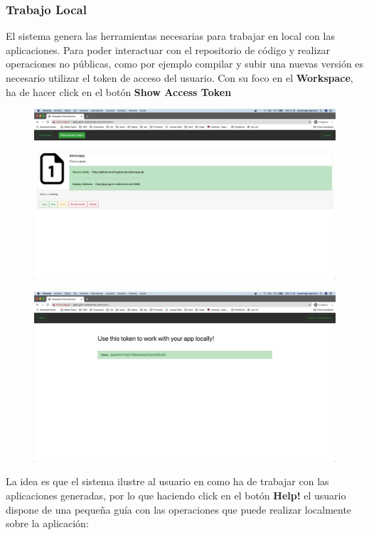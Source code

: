 \documentclass[a4paper,11pt]{book}
\begin{document}
\subsubsection{Trabajo Local}

El sistema genera las herramientas necesarias para trabajar en local con las aplicaciones. Para poder interactuar con el repositorio de código y realizar operaciones no públicas, como por ejemplo compilar y subir una nuevas versión es necesario utilizar el token de acceso del usuario. Con su foco en el \textbf{Workspace}, ha de hacer click en el botón \textbf{Show Access Token}

   \begin{figure}[H]
\centering
\includegraphics[scale=0.2]{imagenes/casouso/3_1.png}
\caption{   }
\end{figure}

   \begin{figure}[H]
\centering
\includegraphics[scale=0.2]{imagenes/casouso/3_3.png}
\caption{   }
\end{figure}

La idea es que el sistema ilustre al usuario en como ha de trabajar con las aplicaciones generadas, por lo  que haciendo click en el botón \textbf{Help!} el usuario dispone de una pequeña guía con las operaciones que puede realizar localmente sobre la aplicación:
\end{document}
